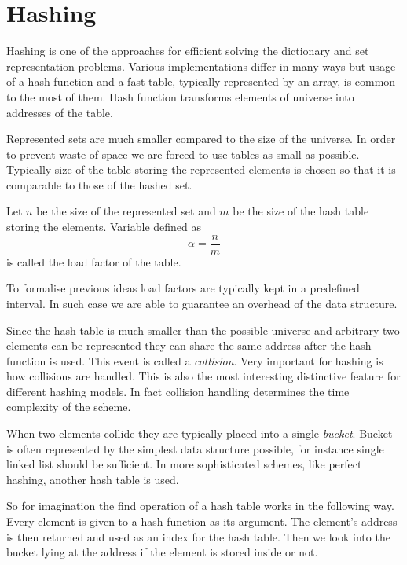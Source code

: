 \chapter{Hashing}
Hashing is one of the approaches for efficient solving the dictionary and set representation problems. Various implementations differ in many ways but usage of a hash function and a fast table, typically represented by an array, is common to the most of them. Hash function transforms elements of universe into addresses of the table.

Represented sets are much smaller compared to the size of the universe. In order to prevent waste of space we are forced to use tables as small as possible. Typically size of the table storing the represented elements is chosen so that it is comparable to those of the hashed set. 

\begin{definition}
\label{definition-load-factor}
Let $n$ be the size of the represented set and $m$ be the size of the hash table storing the elements. Variable defined as \[ \alpha = \frac{n}{m} \] is called the load factor of the table.
\end{definition}

To formalise previous ideas load factors are typically kept in a predefined interval. In such case we are able to guarantee an overhead of the data structure.

Since the hash table is much smaller than the possible universe and arbitrary two elements can be represented they can share the same address after the hash function is used. This event is called a \emph{collision}. Very important for hashing is how collisions are handled. This is also the most interesting distinctive feature for different hashing models. In fact collision handling determines the time complexity of the scheme.

When two elements collide they are typically placed into a single \emph{bucket}. Bucket is often represented by the simplest data structure possible, for instance single linked list should be sufficient. In more sophisticated schemes, like perfect hashing, another hash table is used. 

So for imagination the find operation of a hash table works in the following way. Every element is given to a hash function as its argument. The element's address is then returned and used as an index for the hash table. Then we look into the bucket lying at the address if the element is stored inside or not.

